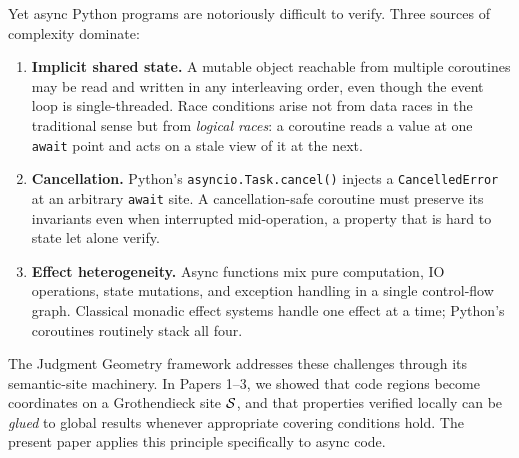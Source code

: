\documentclass[11pt]{article}
\begin{document}
Yet async Python programs are notoriously difficult to verify.  Three sources
of complexity dominate:
\begin{enumerate}[label=(\roman*)]
  \item \textbf{Implicit shared state.}  A mutable object reachable from
        multiple coroutines may be read and written in any interleaving
        order, even though the event loop is single-threaded.  Race
        conditions arise not from data races in the traditional sense but
        from \emph{logical races}: a coroutine reads a value at one
        \texttt{await} point and acts on a stale view of it at the next.

  \item \textbf{Cancellation.}  Python's \texttt{asyncio.Task.cancel()} injects
        a \texttt{CancelledError} at an arbitrary \texttt{await} site.  A
        cancellation-safe coroutine must preserve its invariants even when
        interrupted mid-operation, a property that is hard to state let alone
        verify.

  \item \textbf{Effect heterogeneity.}  Async functions mix pure computation,
        IO operations, state mutations, and exception handling in a single
        control-flow graph.  Classical monadic effect systems handle one
        effect at a time; Python's coroutines routinely stack all four.
\end{enumerate}

The Judgment Geometry framework addresses these challenges through its
semantic-site machinery.  In Papers 1--3, we showed that code regions
become coordinates on a Grothendieck site $\mathcal{S}$, and that properties
verified locally can be \emph{glued} to global results whenever appropriate
covering conditions hold.  The present paper applies this principle
specifically to async code.
\end{document}
